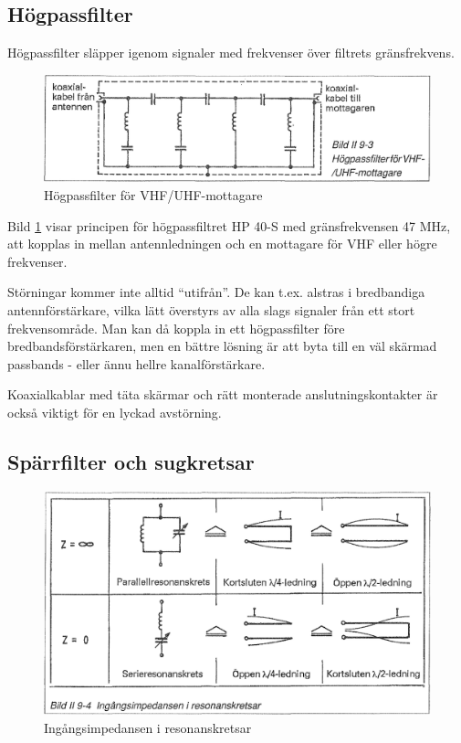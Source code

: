 \subsection{Högpassfilter}

Högpassfilter släpper igenom signaler med frekvenser över filtrets
gränsfrekvens.

\begin{figure}
  \includegraphics[width=\textwidth]{images/bild_2_9-03}
  \caption{Högpassfilter för VHF/UHF-mottagare}
  \label{fig:bildII9-3}
\end{figure}

Bild \ref{fig:bildII9-3} visar principen för högpassfiltret HP 40-S med
gränsfrekvensen 47 MHz, att kopplas in mellan antennledningen och en
mottagare för VHF eller högre frekvenser.

Störningar kommer inte alltid ``utifrån''.  De kan t.ex. alstras i
bredbandiga antennförstärkare, vilka lätt överstyrs av alla slags
signaler från ett stort frekvensområde. Man kan då koppla in ett
högpassfilter före bredbandsförstärkaren, men en bättre lösning är att
byta till en väl skärmad passbands - eller ännu hellre
kanalförstärkare.

Koaxialkablar med täta skärmar och rätt monterade anslutningskontakter
är också viktigt för en lyckad avstörning.

\subsection{Spärrfilter och sugkretsar}

\begin{figure}
  \includegraphics[width=\textwidth]{images/bild_2_9-04}
  \caption{Ingångsimpedansen i resonanskretsar}
  \label{fig:bildII9-4}
\end{figure}

